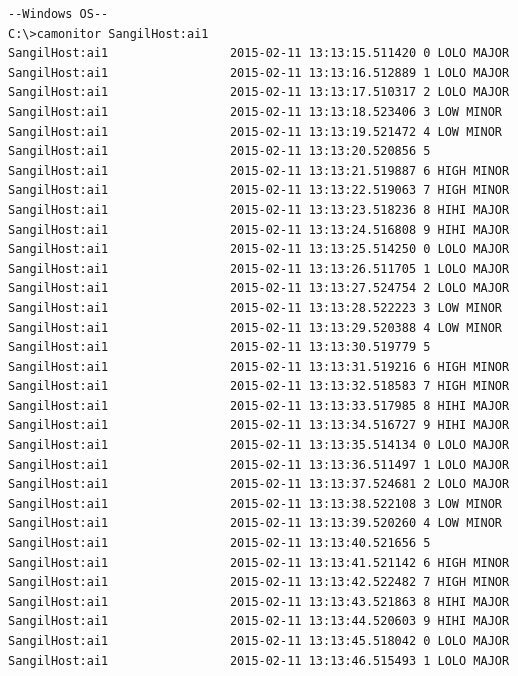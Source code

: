 \documentclass[11pt
  , a4paper
  , article
  , oneside
]{memoir}
\begin{document}
\begin{lstlisting}[style=termstyle]
--Windows OS-- 
C:\>camonitor SangilHost:ai1
SangilHost:ai1                 2015-02-11 13:13:15.511420 0 LOLO MAJOR
SangilHost:ai1                 2015-02-11 13:13:16.512889 1 LOLO MAJOR
SangilHost:ai1                 2015-02-11 13:13:17.510317 2 LOLO MAJOR
SangilHost:ai1                 2015-02-11 13:13:18.523406 3 LOW MINOR
SangilHost:ai1                 2015-02-11 13:13:19.521472 4 LOW MINOR
SangilHost:ai1                 2015-02-11 13:13:20.520856 5
SangilHost:ai1                 2015-02-11 13:13:21.519887 6 HIGH MINOR
SangilHost:ai1                 2015-02-11 13:13:22.519063 7 HIGH MINOR
SangilHost:ai1                 2015-02-11 13:13:23.518236 8 HIHI MAJOR
SangilHost:ai1                 2015-02-11 13:13:24.516808 9 HIHI MAJOR
SangilHost:ai1                 2015-02-11 13:13:25.514250 0 LOLO MAJOR
SangilHost:ai1                 2015-02-11 13:13:26.511705 1 LOLO MAJOR
SangilHost:ai1                 2015-02-11 13:13:27.524754 2 LOLO MAJOR
SangilHost:ai1                 2015-02-11 13:13:28.522223 3 LOW MINOR
SangilHost:ai1                 2015-02-11 13:13:29.520388 4 LOW MINOR
SangilHost:ai1                 2015-02-11 13:13:30.519779 5
SangilHost:ai1                 2015-02-11 13:13:31.519216 6 HIGH MINOR
SangilHost:ai1                 2015-02-11 13:13:32.518583 7 HIGH MINOR
SangilHost:ai1                 2015-02-11 13:13:33.517985 8 HIHI MAJOR
SangilHost:ai1                 2015-02-11 13:13:34.516727 9 HIHI MAJOR
SangilHost:ai1                 2015-02-11 13:13:35.514134 0 LOLO MAJOR
SangilHost:ai1                 2015-02-11 13:13:36.511497 1 LOLO MAJOR
SangilHost:ai1                 2015-02-11 13:13:37.524681 2 LOLO MAJOR
SangilHost:ai1                 2015-02-11 13:13:38.522108 3 LOW MINOR
SangilHost:ai1                 2015-02-11 13:13:39.520260 4 LOW MINOR
SangilHost:ai1                 2015-02-11 13:13:40.521656 5
SangilHost:ai1                 2015-02-11 13:13:41.521142 6 HIGH MINOR
SangilHost:ai1                 2015-02-11 13:13:42.522482 7 HIGH MINOR
SangilHost:ai1                 2015-02-11 13:13:43.521863 8 HIHI MAJOR
SangilHost:ai1                 2015-02-11 13:13:44.520603 9 HIHI MAJOR
SangilHost:ai1                 2015-02-11 13:13:45.518042 0 LOLO MAJOR
SangilHost:ai1                 2015-02-11 13:13:46.515493 1 LOLO MAJOR


\end{lstlisting}
\end{document}
